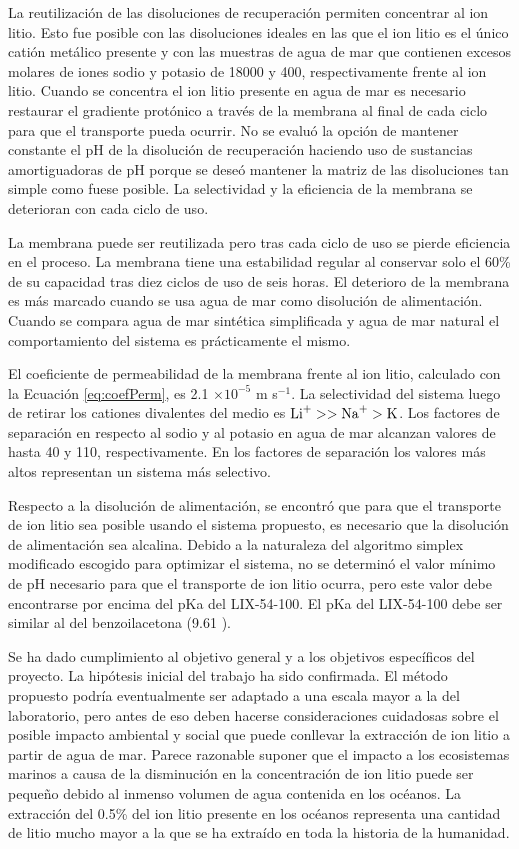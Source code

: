 La reutilización de las disoluciones de recuperación permiten concentrar al ion litio. Esto fue posible con las disoluciones ideales en las que el ion litio es el único catión metálico presente y con las muestras de agua de mar que contienen excesos molares de iones sodio y potasio de 18000 y 400, respectivamente frente al ion litio. Cuando se concentra el ion litio presente en agua de mar es necesario restaurar el gradiente protónico a través de la membrana al final de cada ciclo para que el transporte pueda ocurrir. No se evaluó la opción de mantener constante el pH de la disolución de recuperación haciendo uso de sustancias amortiguadoras de pH porque se deseó mantener la matriz de las disoluciones tan simple como fuese posible. La selectividad y la eficiencia de la membrana se deterioran con cada ciclo de uso.

La membrana puede ser reutilizada pero tras cada ciclo de uso se pierde eficiencia en el proceso. La membrana tiene una estabilidad regular al conservar solo el 60\% de su capacidad tras diez ciclos de uso de seis horas. El deterioro de la membrana es más marcado cuando se usa agua de mar como disolución de alimentación. Cuando se compara agua de mar sintética simplificada y agua de mar natural el comportamiento del sistema es prácticamente el mismo. 

El coeficiente de permeabilidad de la membrana frente al ion litio, calculado con la Ecuación \ref{eq:coefPerm}, es 2.1 $\times10^{-5}$ m s$^{-1}$. La selectividad del sistema luego de retirar los cationes divalentes del medio es $\ce{Li+}>>\ce{Na+}>\ce{K}$. Los factores de separación en respecto al sodio y al potasio en agua de mar alcanzan valores de hasta 40 y 110, respectivamente. En los factores de separación los valores más altos representan un sistema más selectivo.

Respecto a la disolución de alimentación, se encontró que para que el transporte de ion litio sea posible usando el sistema propuesto, es necesario que la disolución de alimentación sea alcalina. Debido a la naturaleza del algoritmo simplex modificado escogido para optimizar el sistema, no se determinó el valor mínimo de pH necesario para que el transporte de ion litio ocurra, pero este valor debe encontrarse por encima del pKa del LIX-54-100. El pKa del LIX-54-100 debe ser similar al del benzoilacetona (9.61 \citep{Witt2017}). 

Se ha dado cumplimiento al objetivo general y a los objetivos específicos del proyecto. La hipótesis inicial del trabajo ha sido confirmada. El método propuesto podría eventualmente ser adaptado a una escala mayor a la del laboratorio, pero antes de eso deben hacerse consideraciones cuidadosas sobre el posible impacto ambiental y social que puede conllevar la extracción de ion litio a partir de agua de mar. Parece razonable suponer que el impacto a los ecosistemas marinos a causa de la disminución en la concentración de ion litio puede ser pequeño debido al inmenso volumen de agua contenida en los océanos. La extracción del 0.5\% del ion litio presente en los océanos representa una cantidad de litio mucho mayor a la que se ha extraído en toda la historia de la humanidad.


